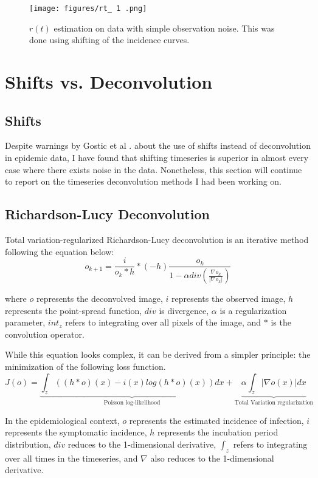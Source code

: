 \documentclass{article}
\begin{document}
\clearpage
\begin{figure}[h!]
    \centering
    \texttt{[image: figures/rt\_ 1 .png]}
    \caption{$r(t)$ estimation on data with simple observation noise. This was done using shifting of the incidence curves.}
\end{figure}


\section{Shifts vs. Deconvolution}

\subsection{Shifts}
Despite warnings by Gostic et al \cite{Gostic}. about the use of shifts instead of deconvolution in epidemic data, I have found that shifting timeseries is superior in almost every case where there exists noise in the data. Nonetheless, this section will continue to report on the timeseries deconvolution methods I had been working on.

\subsection{Richardson-Lucy Deconvolution}
Total variation-regularized Richardson-Lucy deconvolution is an iterative method following the equation below: \cite{RLLoss}
\begin{equation}
    o_{k+1} = \frac{i}{o_k * h} * (-h) \frac{o_k}{1-\alpha div(\frac{\nabla o_k}{|\nabla o_k|})}
\end{equation}

where $o$ represents the deconvolved image, $i$ represents the observed image, $h$ represents the point-spread function, $div$ is divergence, $\alpha$ is a regularization parameter, $int_z$ refers to integrating over all pixels of the image, and $*$ is the convolution operator.

While this equation looks complex, it can be derived from a simpler principle: the minimization of the following loss function. 
\begin{equation}
    J(o) = \underbrace{\int_z ((h*o)(x) - i(x) log(h*o)(x))dx}_{\mbox{Poisson log-likelihood}} + \underbrace{\alpha \int_z |\nabla o(x)| dx}_{\mbox{Total Variation regularization}}
\end{equation}


In the epidemiological context, $o$ represents the estimated incidence of infection, $i$ represents the symptomatic incidence, $h$ represents the incubation period distribution, $div$ reduces to the 1-dimensional derivative,  $\int_z$ refers to integrating over all times in the timeseries, and $\nabla$ also reduces to the 1-dimensional derivative.
\end{document}
